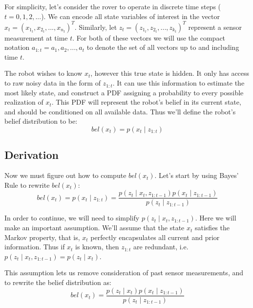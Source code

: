 For simplicity, let's consider the rover to operate in discrete time steps (\(t=0,1,2,...\)). We can encode all state variables of interest in the vector \(x_t = (x_{1_t}, x_{2_t}, ... , x_{n_t})^T\). Similarly, let \(z_t = (z_{1_t}, z_{2_t}, ... , z_{k_t})^T\) represent a sensor measurement at time \(t\). For both of these vectors we will use the compact notation \(a_{1:t} = a_1, a_2, ..., a_t\) to denote the set of all vectors up to and including time \(t\).

The robot wishes to know \(x_t\), however this true state is hidden. It only has access to raw noisy data in the form of \(z_{1:t}\). It can use this information to estimate the most likely state, and construct a PDF assigning a probability to every possible realization of \(x_t\). This PDF will represent the robot's belief in its current state, and should be conditioned on all available data. Thus we'll define the robot's belief distribution to be:
\begin{equation} \label{eqBel}
bel(x_t) = p(x_t \mathbin{\vert} z_{1:t})
\end{equation}

\subsection{Derivation}
Now we must figure out how to compute \(bel(x_t)\). Let's start by using Bayes' Rule to rewrite \(bel(x_t)\):
\begin{equation*}
bel(x_t) = p(x_t \mathbin{\vert} z_{1:t}) = \frac{p(z_t \mathbin{\vert} x_t, z_{1:t-1})p(x_t \mathbin{\vert} z_{1:t-1})}{p(z_t \mathbin{\vert} z_{1:t-1})}
\end{equation*}

In order to continue, we will need to simplify \(p(z_t \mathbin{\vert} x_t, z_{1:t-1})\). Here we will make an important assumption. We'll assume that the state \(x_t\) satisfies the Markov property, that is, \(x_t\) perfectly encapsulates all current and prior information. Thus if \(x_t\) is known, then \(z_{1:t}\) are redundant, i.e. \(p(z_t \mathbin{\vert} x_t, z_{1:t-1}) = p(z_t \mathbin{\vert} x_t)\).

This assumption lets us remove consideration of past sensor measurements, and to rewrite the belief distribution as:
\begin{equation*}
bel(x_t) = \frac{p(z_t \mathbin{\vert} x_t)p(x_t \mathbin{\vert} z_{1:t-1})}{p(z_t \mathbin{\vert} z_{1:t-1})}
\end{equation*}

